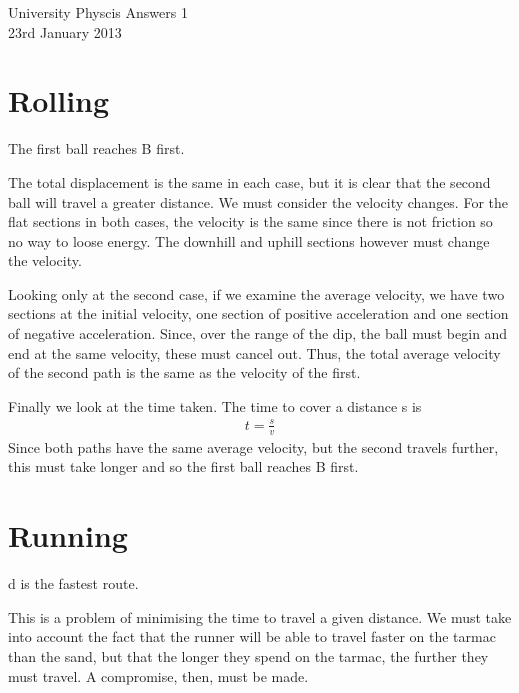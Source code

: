 
\makeatletter
\renewcommand{\@maketitle}{
\newpage
 \null
 \vskip 2em%
 \begin{center}%
  {\Large \@title \par}%
 \end{center}%
 \par} \makeatother

\begin{center}
\Huge University Physcis Answers 1\\[1em]
\large 23rd January 2013
\end{center}
\setcounter{section}{0}

\section{Rolling}
The first ball reaches B first.

The total displacement is the same in each case, but it is clear that the second ball will travel a greater distance. We must consider the velocity changes. For the flat sections in both cases, the velocity is the same since there is not friction so no way to loose energy. The downhill and uphill sections however must change the velocity. 

Looking only at the second case, if we examine the average velocity, we have two sections at the initial velocity, one section of positive acceleration and one section of negative acceleration. Since, over the range of the dip, the ball must begin and end at the same velocity, these must cancel out. Thus, the total average velocity of the second path is the same as the velocity of the first.

Finally we look at the time taken. The time to cover a distance s is
\begin{align*}
	t = \frac{s}{v}
\end{align*}
Since both paths have the same average velocity, but the second travels further, this must take longer and so the first ball reaches B first.

\section{Running}
d is the fastest route.

This is a problem of minimising the time to travel a given distance. We must take into account the fact that the runner will be able to travel faster on the tarmac than the sand, but that the longer they spend on the tarmac, the further they must travel. A compromise, then, must be made.

